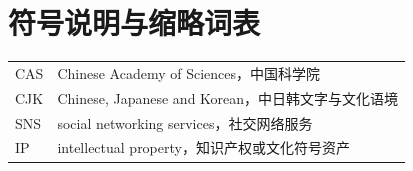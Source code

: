 \chapter*{符号说明与缩略词表}

\begin{longtable}{@{}p{}p{}@{}}
  CAS & Chinese Academy of Sciences，中国科学院 \\
  CJK & Chinese, Japanese and Korean，中日韩文字与文化语境 \\
  SNS & social networking services，社交网络服务 \\
  IP & intellectual property，知识产权或文化符号资产 \\
\end{longtable}
